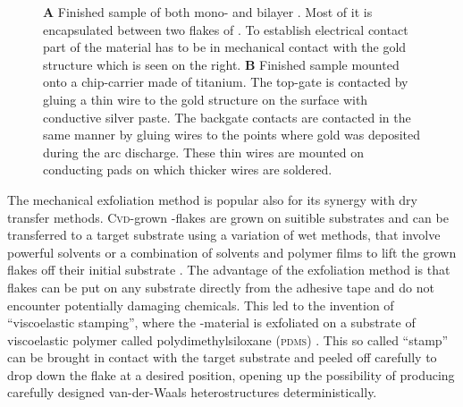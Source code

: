 \begin{figure}[t]
\begin{subfigure}{0.4\textwidth}
\end{subfigure}
\begin{subfigure}{0.4\textwidth}
	\caption{}
\end{subfigure}
\caption{\textbf{A} Finished sample of both mono- and bilayer \wse\!. Most of it is encapsulated between two flakes of \hbng. To establish electrical contact part of the \tmdg material has to be in mechanical contact with the gold structure which is seen on the right. \textbf{B} Finished sample mounted onto a chip-carrier made of titanium. The top-gate is contacted by gluing a thin wire to the gold structure on the surface with conductive silver paste. The backgate contacts are contacted in the same manner by gluing wires to the points where gold was deposited during the arc discharge. These thin wires are mounted on conducting pads on which thicker wires are soldered.}
	\label{pattern}
\end{figure}

The mechanical exfoliation method is popular also for its synergy with dry transfer methods. \textsc{Cvd}-grown \tmd-flakes are grown on suitible substrates and can be transferred to  a target substrate using a variation of wet methods, that involve powerful solvents or a combination of solvents and polymer films to lift the grown flakes off their initial substrate  \cite{li_universal_2014}. The advantage of the exfoliation method is that flakes can be put on any substrate directly from the adhesive tape and do not encounter potentially damaging chemicals. This led to the invention of ``viscoelastic stamping'', where the \tmd-material is exfoliated on a substrate of viscoelastic polymer called polydimethylsiloxane (\textsc{pdms}) \cite{castellanos-gomez_deterministic_2014}. This so called ``stamp'' can be brought in contact with the target substrate and peeled off carefully to drop down the flake at a desired position, opening up the possibility of producing carefully designed van-der-Waals heterostructures deterministically.


